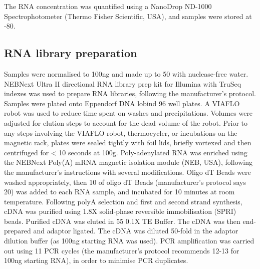 The RNA concentration was quantified using a NanoDrop ND-1000 Spectrophotometer (Thermo Fisher Scientific, USA), and samples were stored at -80\C{}.

\subsection{RNA library preparation}
Samples were normalised to 100\si{\ng} and made up to 50\ul{} with nuclease-free water.
NEBNext\textsuperscript{\textregistered} Ultra II directional RNA library prep kit for Illumina\textsuperscript{\textregistered} with TruSeq indexes was used to prepare RNA libraries, following the manufacturer's protocol.
Samples were plated onto Eppendorf DNA lobind 96 well plates.
A VIAFLO robot was used to reduce time spent on washes and precipitations.
Volumes were adjusted for elution steps to account for the dead volume of the robot.
Prior to any steps involving the VIAFLO robot, thermocycler, or incubations on the magnetic rack, plates were sealed tightly with foil lids, briefly vortexed and then centrifuged for < 10 seconds at 100g.
Poly-adenylated RNA was enriched using the NEBNext Poly(A) mRNA magnetic isolation module (NEB, USA), following the manufacturer's instructions with several modifications.
Oligo dT Beads were washed appropriately, then 10\ul{} of oligo dT Beads (manufacturer's protocol says 20\ul{}) was added to each RNA sample, and incubated for 10 minutes at room temperature.
Following polyA selection and first and second strand synthesis, cDNA was purified using 1.8X solid-phase reversible immobilisation (SPRI)
beads.
Purified cDNA was eluted in 55\ul{} 0.1X TE Buffer.
The cDNA was then end-prepared and adaptor ligated.
The cDNA was diluted 50-fold in the adaptor dilution buffer (as 100ng starting RNA was used).
PCR amplification was carried out using 11 PCR cycles (the manufacturer's protocol recommends 12-13 for 100ng starting RNA), in order to minimise PCR duplicates.

